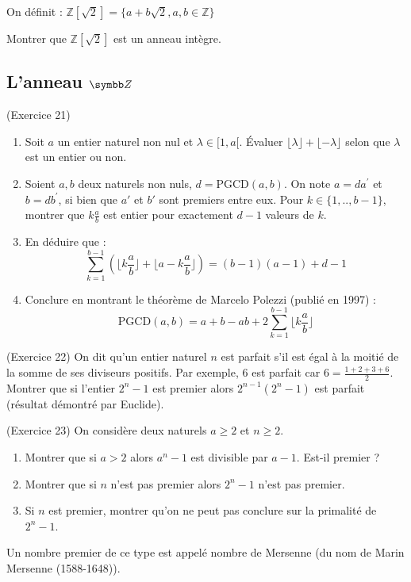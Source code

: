 \begin{exercice}
On définit :
$\mathbb{Z}[\sqrt{2}]=\{a+b\sqrt{2},a,b\in\mathbb{Z}\}$

Montrer que $\mathbb{Z}[\sqrt{2}]$ est un anneau intègre. 
\end{exercice}

\subsection{L'anneau \texorpdfstring{$\Z$}{Z}}

\begin{exercice}
(Exercice 21)
\begin{enumerate}
 \item Soit $a$ un entier naturel non nul et $\lambda\in[1,a[$. Évaluer $\lfloor \lambda \rfloor + \lfloor -\lambda \rfloor$ selon que $\lambda$ est un entier ou non. 
 \item Soient $a, b$ deux naturels non nuls, $d=\text{PGCD}(a,b)$. 
 On note $a=da^{\prime}$ et $b=db^{\prime}$, si bien que $a'$ et $b'$ sont premiers entre eux. 
 Pour $k\in\{1,..,b-1\}$, montrer que $k\frac{a}{b}$ est entier pour exactement $d-1$ valeurs de $k$. 
 \item En déduire que :
 $$ \sum_{k=1}^{b-1}\left(\lfloor k\frac{a}{b}\rfloor+\lfloor a-k\frac{a}{b}\rfloor\right)=(b-1)(a-1)+d-1 $$ 
 \item Conclure en montrant le théorème de Marcelo Polezzi (publié en 1997) :
 $$ \text{PGCD}(a,b)=a+b-ab+2\sum_{k=1}^{b-1}\lfloor k\frac{a}{b}\rfloor $$ 
\end{enumerate}
\end{exercice}

\begin{exercice}
(Exercice 22)
On dit qu'un entier naturel $n$ est parfait s'il est égal à la moitié de la somme de ses diviseurs positifs. 
Par exemple, $6$ est parfait car $6=\frac{1+2+3+6}{2}$. 
Montrer que si l'entier $2^{n}-1$ est premier alors $2^{n-1}(2^{n}-1)$ est parfait (résultat démontré par Euclide). 
\end{exercice}

\begin{exercice}
(Exercice 23)
On considère deux naturels $a\ge2$ et $n\ge2$. 
\begin{enumerate}
 \item[a)] Montrer que si $a>2$ alors $a^{n}-1$ est divisible par $a-1$. Est-il premier ? 
 \item[b)] Montrer que si $n$ n'est pas premier alors $2^{n}-1$ n'est pas premier. 
 \item[c)] Si $n$ est premier, montrer qu'on ne peut pas conclure sur la primalité de $2^{n}-1$. 
\end{enumerate}
Un nombre premier de ce type est appelé nombre de Mersenne (du nom de Marin Mersenne (1588-1648)). 
\end{exercice}

